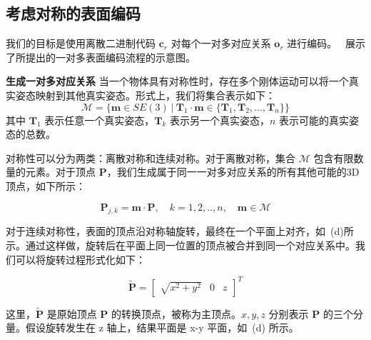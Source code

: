 \subsection{考虑对称的表面编码}
我们的目标是使用离散二进制代码 $\mathbf{c}_r$ 对每个一对多对应关系 $\mathbf{o}_r$ 进行编码。~ 展示了所提出的一对多表面编码流程的示意图。

\textbf{生成一对多对应关系 } 当一个物体具有对称性时，存在多个刚体运动可以将一个真实姿态映射到其他真实姿态。形式上，我们将集合表示如下：
\begin{equation}
\mathcal{M} = \{\mathbf{m}\in SE(3)\ |\ \mathbf{T}_1 \cdot \mathbf{m} \in \{\mathbf{T}_1, \mathbf{T}_2,..., \mathbf{T}_n\} \}
\label{eq:rigid_motions}
\end{equation}
其中 $\mathbf{T}_1$ 表示任意一个真实姿态，$\mathbf{T}_k$ 表示另一个真实姿态，$n$ 表示可能的真实姿态的总数。

对称性可以分为两类：离散对称和连续对称。对于离散对称，集合 $\mathcal{M}$ 包含有限数量的元素。对于顶点 $\mathbf{P}$，我们生成属于同一一对多对应关系的所有其他可能的3D顶点，如下所示：

\begin{equation}
\mathbf{P}_{j,k}=\mathbf{m} \cdot \mathbf{P},\quad k=1,2,..,n, \quad \mathbf{m} \in \mathcal{M}\label{eq:generate_correspondence}
\end{equation}


对于连续对称性，表面的顶点沿对称轴旋转，最终在一个平面上对齐，如~(d)所示。通过这样做，旋转后在平面上同一位置的顶点被合并到同一个对应关系中。我们可以将旋转过程形式化如下：

\begin{equation}
\tilde{\mathbf{P}}=
\begin{bmatrix}
 \sqrt{x^2+y^2}  &0 &z
\end{bmatrix}^T
\label{eq:rotation_projection}
\end{equation}

这里，$\tilde{\mathbf{P}}$ 是原始顶点 $\mathbf{P}$ 的转换顶点，被称为主顶点。$x, y, z$ 分别表示 $\mathbf{P}$ 的三个分量。假设旋转发生在 z 轴上，结果平面是 x-y 平面，如~(d) 所示。

